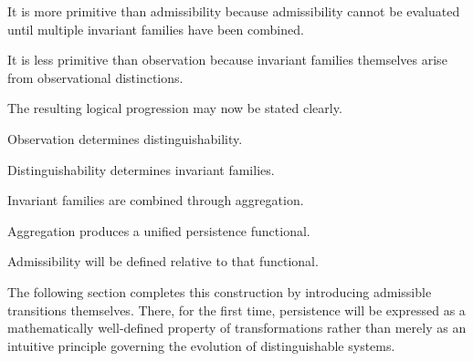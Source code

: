 \documentclass[11pt]{book}
\numberwithin{equation}{chapter}
\theoremstyle{definition}
\theoremstyle{plain}
\begin{document}
It is more primitive than admissibility because admissibility cannot be evaluated until multiple invariant families have been combined.

It is less primitive than observation because invariant families themselves arise from observational distinctions.

The resulting logical progression may now be stated clearly.

Observation determines distinguishability.

Distinguishability determines invariant families.

Invariant families are combined through aggregation.

Aggregation produces a unified persistence functional.

Admissibility will be defined relative to that functional.

The following section completes this construction by introducing admissible transitions themselves. There, for the first time, persistence will be expressed as a mathematically well-defined property of transformations rather than merely as an intuitive principle governing the evolution of distinguishable systems.
\end{document}
